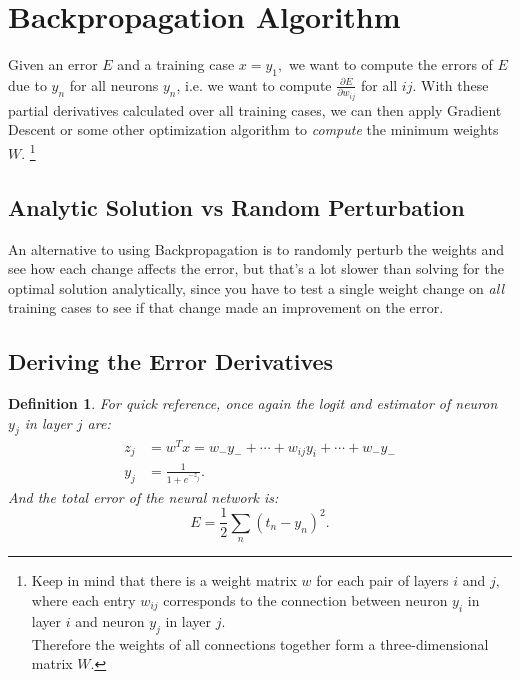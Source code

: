 \documentclass[12pt]{article}
\theoremstyle{plain}
\newtheorem{definition}[theorem]{Definition}
\theoremstyle{definition}
\theoremstyle{remark}
\begin{document}
\section{Backpropagation Algorithm}

\begin{mdframed}
Given an error $E$ and a training case $x = y_1,$ we want to compute the errors of $E$ due to $y_n$ for all neurons $y_n$, i.e. we want to compute $\frac{\partial E}{\partial w_{ij}}$ for all $ij$. With these partial derivatives calculated over all training cases, we can then apply Gradient Descent or some other optimization algorithm to \textit{compute} the minimum weights $W.$
\footnote{Keep in mind that there is a weight matrix $w$ for each pair of layers $i$ and $j,$ where each entry $w_{ij}$ corresponds to the connection between neuron $y_i$ in layer $i$ and neuron $y_j$ in layer $j.$ \\ Therefore the weights of all connections together form a three-dimensional matrix $W.$}
\end{mdframed}

\subsection{Analytic Solution vs Random Perturbation}

An alternative to using Backpropagation is to randomly perturb the weights and see how each change affects the error, but that's a lot slower than solving for the optimal solution analytically, since you have to test a single weight change on \textit{all} training cases to see if that change made an improvement on the error.

\subsection{Deriving the Error Derivatives}

\begin{definition}
For quick reference, once again the logit and estimator of neuron $y_j$ in layer $j$ are:
\begin{align*}
z_j &= w^T x = w_- y_- + \cdots + w_{ij} y_i + \cdots + w_- y_- \\
y_j &= \frac{1}{1 + e^{-z_j}}.
\end{align*}
And the total error of the neural network is:
$$E = \frac{1}{2} \sum_n (t_n - y_n)^2.$$
\end{definition}
\end{document}
